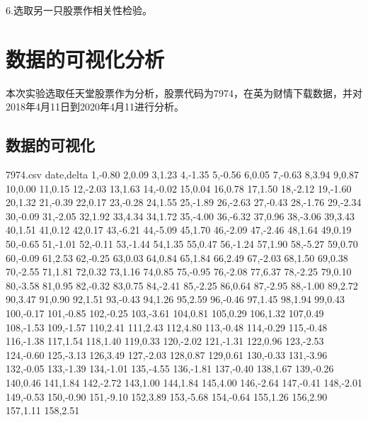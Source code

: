 \documentclass[a4paper, 11pt]{article}
\begin{document}
 	6.选取另一只股票作相关性检验。
 	
 	\section{数据的可视化分析}
		本次实验选取任天堂股票作为分析，股票代码为7974，在英为财情下载数据，并对2018年4月11日到2020年4月11进行分析。
	
	\subsection{数据的可视化}
	
	\begin{filecontents*}{7974.csv}
		date,delta
		1,-0.80%
		2,0.09%
		3,1.23%
		4,-1.35%
		5,-0.56%
		6,0.05%
		7,-0.63%
		8,3.94%
		9,0.87%
		10,0.00%
		11,0.15%
		12,-2.03%
		13,1.63%
		14,-0.02%
		15,0.04%
		16,0.78%
		17,1.50%
		18,-2.12%
		19,-1.60%
		20,1.32%
		21,-0.39%
		22,0.17%
		23,-0.28%
		24,1.55%
		25,-1.89%
		26,-2.63%
		27,-0.43%
		28,-1.76%
		29,-2.34%
		30,-0.09%
		31,-2.05%
		32,1.92%
		33,4.34%
		34,1.72%
		35,-4.00%
		36,-6.32%
		37,0.96%
		38,-3.06%
		39,3.43%
		40,1.51%
		41,0.12%
		42,0.17%
		43,-6.21%
		44,-5.09%
		45,1.70%
		46,-2.09%
		47,-2.46%
		48,1.64%
		49,0.19%
		50,-0.65%
		51,-1.01%
		52,-0.11%
		53,-1.44%
		54,1.35%
		55,0.47%
		56,-1.24%
		57,1.90%
		58,-5.27%
		59,0.70%
		60,-0.09%
		61,2.53%
		62,-0.25%
		63,0.03%
		64,0.84%
		65,1.84%
		66,2.49%
		67,-2.03%
		68,1.50%
		69,0.38%
		70,-2.55%
		71,1.81%
		72,0.32%
		73,1.16%
		74,0.85%
		75,-0.95%
		76,-2.08%
		77,6.37%
		78,-2.25%
		79,0.10%
		80,-3.58%
		81,0.95%
		82,-0.32%
		83,0.75%
		84,-2.41%
		85,-2.25%
		86,0.64%
		87,-2.95%
		88,-1.00%
		89,2.72%
		90,3.47%
		91,0.90%
		92,1.51%
		93,-0.43%
		94,1.26%
		95,2.59%
		96,-0.46%
		97,1.45%
		98,1.94%
		99,0.43%
		100,-0.17%
		101,-0.85%
		102,-0.25%
		103,-3.61%
		104,0.81%
		105,0.29%
		106,1.32%
		107,0.49%
		108,-1.53%
		109,-1.57%
		110,2.41%
		111,2.43%
		112,4.80%
		113,-0.48%
		114,-0.29%
		115,-0.48%
		116,-1.38%
		117,1.54%
		118,1.40%
		119,0.33%
		120,-2.02%
		121,-1.31%
		122,0.96%
		123,-2.53%
		124,-0.60%
		125,-3.13%
		126,3.49%
		127,-2.03%
		128,0.87%
		129,0.61%
		130,-0.33%
		131,-3.96%
		132,-0.05%
		133,-1.39%
		134,-1.01%
		135,-4.55%
		136,-1.81%
		137,-0.40%
		138,1.67%
		139,-0.26%
		140,0.46%
		141,1.84%
		142,-2.72%
		143,1.00%
		144,1.84%
		145,4.00%
		146,-2.64%
		147,-0.41%
		148,-2.01%
		149,-0.53%
		150,-0.90%
		151,-9.10%
		152,3.89%
		153,-5.68%
		154,-0.64%
		155,1.26%
		156,2.90%
		157,1.11%
		158,2.51%

\end{filecontents*}
\end{document}
